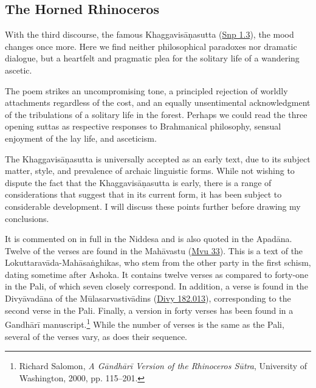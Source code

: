 \documentclass[12pt,openany]{book}%
\begin{document}
\subsection*{The Horned Rhinoceros}

With the third discourse, the famous \textsanskrit{Khaggavisāṇasutta} (\href{https://suttacentral.net/snp1.3/en/sujato}{Snp 1.3}), the mood changes once more. Here we find neither philosophical paradoxes nor dramatic dialogue, but a heartfelt and pragmatic plea for the solitary life of a wandering ascetic.

The poem strikes an uncompromising tone, a principled rejection of worldly attachments regardless of the cost, and an equally unsentimental acknowledgment of the tribulations of a solitary life in the forest. Perhaps we could read the three opening suttas as respective responses to Brahmanical philosophy, sensual enjoyment of the lay life, and asceticism.

The \textsanskrit{Khaggavisāṇasutta} is universally accepted as an early text, due to its subject matter, style, and prevalence of archaic linguistic forms. While not wishing to dispute the fact that the \textsanskrit{Khaggavisāṇasutta} is early, there is a range of considerations that suggest that in its current form, it has been subject to considerable development. I will discuss these points further before drawing my conclusions.

It is commented on in full in the Niddesa and is also quoted in the \textsanskrit{Apadāna}. Twelve of the verses are found in the \textsanskrit{Mahāvastu} (\href{https://suttacentral.net/san-lo-mvu33/san/senart}{Mvu 33}). This is a text of the \textsanskrit{Lokuttaravāda}-\textsanskrit{Mahāsaṅghikas}, who stem from the other party in the first schism, dating sometime after Ashoka. It contains twelve verses as compared to forty-one in the Pali, of which seven closely correspond. In addition, a verse is found in the \textsanskrit{Divyāvadāna} of the \textsanskrit{Mūlasarvastivādins} (\href{https://suttacentral.net/divy20/san/vaidya\#vai182.013}{Divy 182.013}), corresponding to the second verse in the Pali. Finally, a version in forty verses has been found in a \textsanskrit{Gandhārī} manuscript.\footnote{Richard Salomon, \textit{A \textsanskrit{Gāndhārī} Version of the Rhinoceros \textsanskrit{Sūtra}}, University of Washington, 2000, pp. 115–201. } While the number of verses is the same as the Pali, several of the verses vary, as does their sequence.
\end{document}
